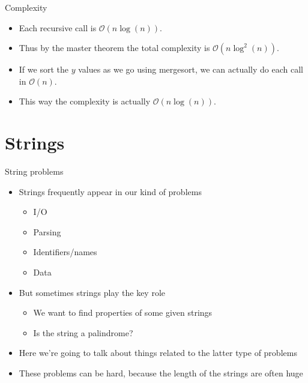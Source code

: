 \documentclass{beamer}
\begin{document}
\begin{frame}[plain]{Complexity}
	\begin{itemize}
        \item Each recursive call is $\mathcal{O}(n\log(n))$. 
        \item Thus by the master theorem the total complexity is $\mathcal{O}(n\log^2(n))$.
        \item If we sort the $y$ values as we go using mergesort, we can actually do each call in $\mathcal{O}(n)$.
        \item This way the complexity is actually $\mathcal{O}(n\log(n))$.
    \end{itemize}
\end{frame}


\section*{Strings}

\begin{frame}[plain]{String problems}
    \begin{itemize}
        \item Strings frequently appear in our kind of problems
        \begin{itemize}
            \item I/O
            \item Parsing
            \item Identifiers/names
            \item Data
        \end{itemize}
        \vspace{5pt}
        \item But sometimes strings play the key role
        \begin{itemize}
            \item We want to find properties of some given strings
            \item Is the string a palindrome?
        \end{itemize}
        \vspace{5pt}
        \item Here we're going to talk about things related to the latter type of problems
        \vspace{5pt}
        \item These problems can be hard, because the length of the strings are often huge
    \end{itemize}
\end{frame}
\end{document}
